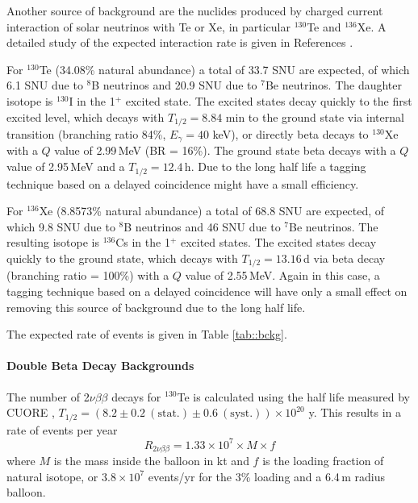 Another source of background are the nuclides produced by charged current
interaction of solar neutrinos with Te or Xe, in particular $^{130}$Te and
$^{136}$Xe. A detailed study of the expected interaction rate is given in
References \cite{eijiri14, eijiri17}. 

For $^{130}$Te (34.08\% natural abundance) a total of 33.7 SNU are expected,
of which 6.1 SNU due to $^{8}$B neutrinos and 20.9 SNU due to $^{7}$Be
neutrinos. The daughter isotope is $^{130}$I in the 1$^{+}$ excited state.
The excited states decay quickly to the first excited level, which decays with
$T_{1/2}=8.84$ min to the ground state via internal transition (branching
ratio 84\%, $E_\gamma=40$ keV), or directly beta decays to $^{130}$Xe with a
$Q$ value of 2.99\,MeV (BR = 16\%). The ground state beta decays with a
$Q$ value of 2.95\,MeV and a $T_{1/2}=12.4$\,h. Due to the long half life a
tagging technique based on a delayed coincidence might have a small efficiency.

For $^{136}$Xe (8.8573\% natural abundance) a total of 68.8 SNU are expected,
of which 9.8 SNU due to $^{8}$B neutrinos and 46 SNU due to $^{7}$Be neutrinos.
The resulting isotope is $^{136}$Cs in the 1$^{+}$ excited states. The
excited states decay quickly to the ground state, which decays with
$T_{1/2}=13.16$\,d via beta decay (branching ratio = 100\%) with a $Q$ value
of 2.55\,MeV. Again in this case, a tagging technique
based on a delayed coincidence will have only a small effect on removing this
source of background due to the long half life.

The expected rate of events is given in Table \ref{tab::bckg}.

\paragraph{Double Beta Decay Backgrounds}

The number of 2$\nu\beta\beta$ decays for $^{130}$Te is calculated using the
half life measured by CUORE \cite{Cuore017},
$T_{1/2}=(8.2\pm0.2~\mathrm{(stat.)}\pm0.6~\mathrm{(syst.)})\times 10^{20}$ y.
This results in a rate of events per year
\begin{equation}
R_{2\nu\beta\beta} = 1.33 \times 10^{7} \times M \times f
\end{equation} 
where $M$ is the mass inside the balloon in kt and $f$ is the loading fraction
of natural isotope, or $3.8\times10^7$ events/yr for the 3\% loading and a
6.4\,m radius balloon.\\
 
